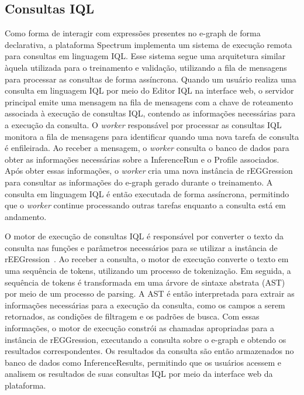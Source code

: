 \subsection{Consultas IQL}
\label{sec:iql_query}
Como forma de interagir com expressões presentes no e-graph de forma declarativa, a plataforma Spectrum implementa um sistema de execução remota para consultas em linguagem IQL. Esse sistema segue uma arquitetura similar àquela utilizada para o treinamento e validação, utilizando a fila de mensagens para processar as consultas de forma assíncrona. Quando um usuário realiza uma consulta em linguagem IQL por meio do Editor IQL na interface web, o servidor principal emite uma mensagem na fila de mensagens com a chave de roteamento associada à execução de consultas IQL, contendo as informações necessárias para a execução da consulta. O \textit{worker} responsável por processar as consultas IQL monitora a fila de mensagens para identificar quando uma nova tarefa de consulta é enfileirada. Ao receber a mensagem, o \textit{worker} consulta o banco de dados para obter as informações necessárias sobre a InferenceRun e o Profile associados. Após obter essas informações, o \textit{worker} cria uma nova instância de rEGGression para consultar as informações do e-graph gerado durante o treinamento. A consulta em linguagem IQL é então executada de forma assíncrona, permitindo que o \textit{worker} continue processando outras tarefas enquanto a consulta está em andamento.

O motor de execução de consultas IQL é responsável por converter o texto da consulta nas funções e parâmetros necessários para se utilizar a instância de rEEGression~\cite{rEGGression}. Ao receber a consulta, o motor de execução converte o texto em uma sequência de tokens, utilizando um processo de tokenização. Em seguida, a sequência de tokens é transformada em uma árvore de sintaxe abstrata (AST) por meio de um processo de parsing. A AST é então interpretada para extrair as informações necessárias para a execução da consulta, como os campos a serem retornados, as condições de filtragem e os padrões de busca. Com essas informações, o motor de execução constrói as chamadas apropriadas para a instância de rEGGression, executando a consulta sobre o e-graph e obtendo os resultados correspondentes. Os resultados da consulta são então armazenados no banco de dados como InferenceResults, permitindo que os usuários acessem e analisem os resultados de suas consultas IQL por meio da interface web da plataforma.

